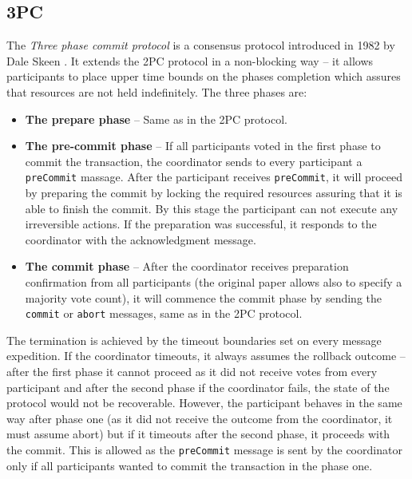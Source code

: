 \documentclass[oneside,
  digital, %
  table,   %
  nolof,     %
  nolot,     %
]{fithesis3}
\begin{document}
\subsection{3PC}

The \textit{Three phase commit protocol} is a consensus protocol introduced in 1982 by Dale Skeen \cite{3PC}. It extends the 2PC protocol in a non-blocking way -- it allows participants to place upper time bounds on the phases completion which assures that resources are not  held indefinitely. The three phases are:

\begin{itemize}
    \item \textbf{The prepare phase} -- Same as in the 2PC protocol.
    
    \item \textbf{The pre-commit phase} -- If all participants voted in the first phase to commit the transaction, the coordinator sends to every participant a \texttt{preCommit} massage. After the participant receives \texttt{preCommit}, it will proceed by preparing the commit by locking the required resources assuring that it is able to finish the commit. By this stage the participant can not execute any irreversible actions. If the preparation was successful, it responds to the coordinator with the acknowledgment message.
    
    \item \textbf{The commit phase} -- After the coordinator receives preparation confirmation from all participants (the original paper \cite{3PC} allows also to specify a majority vote count), it will commence the commit phase by sending the \texttt{commit} or \texttt{abort} messages, same as in the 2PC protocol.
\end{itemize}

The termination is achieved by the timeout boundaries set on every message expedition. If the coordinator timeouts, it always assumes the rollback outcome -- after the first phase it cannot proceed as it did not receive votes from every participant and after the second phase if the coordinator fails, the state of the protocol would not be recoverable. However, the participant behaves in the same way after phase one (as it did not receive the outcome from the coordinator, it must assume abort) but if it timeouts after the second phase, it proceeds with the commit. This is allowed as the \texttt{preCommit} message is sent by the coordinator only if all participants wanted to commit the transaction in the phase one.
\end{document}
